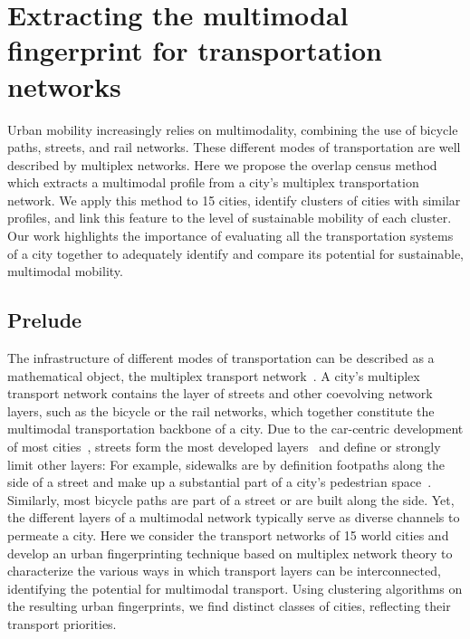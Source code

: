 
\chapter{Extracting the multimodal fingerprint for transportation networks}

Urban mobility increasingly relies on multimodality, combining the use of bicycle paths, streets, and rail networks. These different modes of transportation are well described by multiplex networks. Here we propose the overlap census method which extracts a multimodal profile from a city's multiplex transportation network. We apply this method to 15 cities, identify clusters of cities with similar profiles, and link this feature to the level of sustainable mobility of each cluster. Our work highlights the importance of evaluating all the transportation systems of a city together to adequately identify and compare its potential for sustainable, multimodal mobility.


\section{Prelude}
The infrastructure of different modes of transportation can be described as a mathematical object, the multiplex transport network~\cite{Morris2012Transport,Strano2012Evolution,Barthelemy2013Evolution,Battiston2014Structural,Gallotti2014Efficiency,DeDomenico2014Navigability,Strano2015Features,Aleta2017Multilayer,Lee2017Morphology}. A city's multiplex transport network contains the layer of streets and other coevolving network layers, such as the bicycle or the rail networks, which together constitute the multimodal transportation backbone of a city. Due to the car-centric development of most cities~\cite{Jacobs1961Death}, streets form the most developed layers~\cite{Gossling2016Distribution,Szell2018Crowdsourced} and define or strongly limit other layers: For example, sidewalks are by definition footpaths along the side of a street and make up a substantial part of a city's pedestrian space~\cite{Gossling2016Distribution}. Similarly, most bicycle paths are part of a street or are built along the side. Yet, the different layers of a multimodal network typically serve as diverse channels to permeate a city. Here we consider the transport networks of 15 world cities and develop an urban fingerprinting technique based on multiplex network theory to characterize the various ways in which transport layers can be interconnected, identifying the potential for multimodal transport. Using clustering algorithms on the resulting urban fingerprints, we find distinct classes of cities, reflecting their transport priorities.

